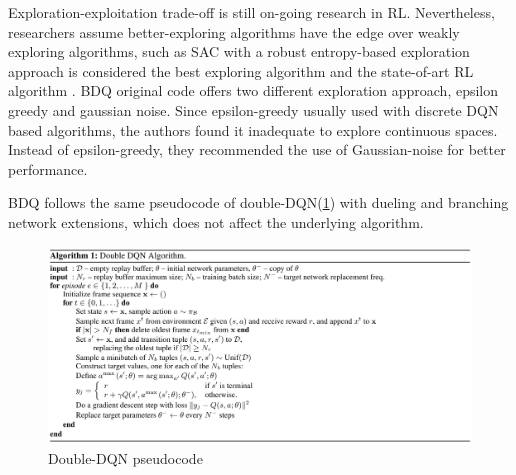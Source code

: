 Exploration-exploitation trade-off is still on-going research in RL. Nevertheless, researchers assume better-exploring algorithms have the edge over weakly exploring algorithms, such as SAC with a robust entropy-based exploration approach is considered the best exploring algorithm and the state-of-art RL algorithm \cite{Haarnoja2018}. BDQ original code offers two different exploration approach, epsilon greedy and gaussian noise. Since epsilon-greedy usually used with discrete DQN based algorithms, the authors found it inadequate to explore continuous spaces. Instead of epsilon-greedy, they recommended the use of Gaussian-noise for better performance.

BDQ follows the same pseudocode of double-DQN(\ref{fig:bdqalgo}) with dueling and branching network extensions, which does not affect the underlying algorithm.

\begin{figure}[htbp] 
    \centering
    \includegraphics[width=1.0\textwidth]{figures/BDQalgo}
    \caption{Double-DQN pseudocode \cite{Wang2016}}
    \label{fig:bdqalgo}
\end{figure}
